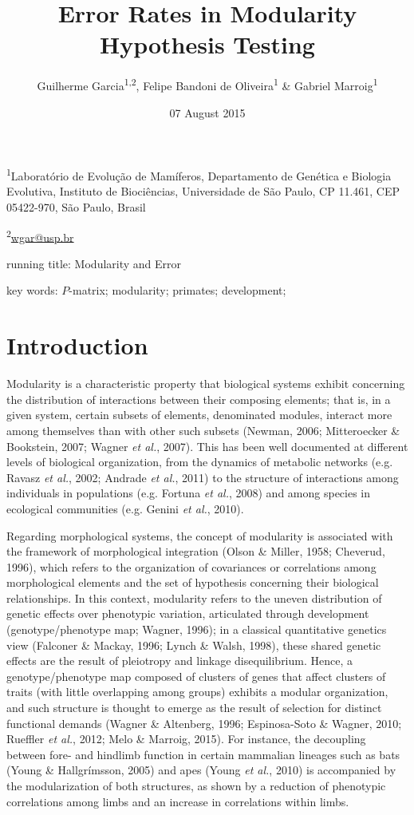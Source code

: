 \documentclass[12pt,]{article}
\title{Error Rates in Modularity Hypothesis Testing}
\author{Guilherme Garcia\textsuperscript{1,2}, Felipe Bandoni de
Oliveira\textsuperscript{1} \& Gabriel Marroig\textsuperscript{1}}
\date{07 August 2015}
\begin{document}
\maketitle


\linenumbers
\modulolinenumbers[2]

\onehalfspacing

\textsuperscript{1}Laboratório de Evolução de Mamíferos, Departamento de
Genética e Biologia Evolutiva, Instituto de Biociências, Universidade de
São Paulo, CP 11.461, CEP 05422-970, São Paulo, Brasil

\textsuperscript{2}\href{mailto:wgar@usp.br}{wgar@usp.br}

running title: Modularity and Error

key words: $P$-matrix; modularity; primates; development;

\section{Introduction}\label{introduction}

Modularity is a characteristic property that biological systems exhibit
concerning the distribution of interactions between their composing
elements; that is, in a given system, certain subsets of elements,
denominated modules, interact more among themselves than with other such
subsets (Newman, 2006; Mitteroecker \& Bookstein, 2007; Wagner \emph{et
al.}, 2007). This has been well documented at different levels of
biological organization, from the dynamics of metabolic networks (e.g.
Ravasz \emph{et al.}, 2002; Andrade \emph{et al.}, 2011) to the
structure of interactions among individuals in populations (e.g. Fortuna
\emph{et al.}, 2008) and among species in ecological communities (e.g.
Genini \emph{et al.}, 2010).

Regarding morphological systems, the concept of modularity is associated
with the framework of morphological integration (Olson \& Miller, 1958;
Cheverud, 1996), which refers to the organization of covariances or
correlations among morphological elements and the set of hypothesis
concerning their biological relationships. In this context, modularity
refers to the uneven distribution of genetic effects over phenotypic
variation, articulated through development (genotype/phenotype map;
Wagner, 1996); in a classical quantitative genetics view (Falconer \&
Mackay, 1996; Lynch \& Walsh, 1998), these shared genetic effects are
the result of pleiotropy and linkage disequilibrium. Hence, a
genotype/phenotype map composed of clusters of genes that affect
clusters of traits (with little overlapping among groups) exhibits a
modular organization, and such structure is thought to emerge as the
result of selection for distinct functional demands (Wagner \&
Altenberg, 1996; Espinosa-Soto \& Wagner, 2010; Rueffler \emph{et al.},
2012; Melo \& Marroig, 2015). For instance, the decoupling between fore-
and hindlimb function in certain mammalian lineages such as bats (Young
\& Hallgrímsson, 2005) and apes (Young \emph{et al.}, 2010) is
accompanied by the modularization of both structures, as shown by a
reduction of phenotypic correlations among limbs and an increase in
correlations within limbs.
\end{document}

